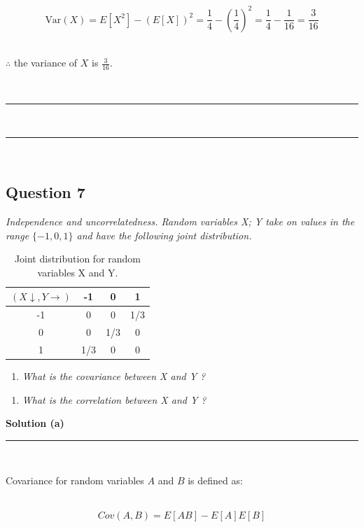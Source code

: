 \documentclass{article}
\begin{document}
$$\text{Var}(X) = E[X^2] - (E[X])^2 = \frac{1}{4} - (\frac{1}{4})^2 = \frac{1}{4} - \frac{1}{16} = \frac{3}{16}$$\\

\parbox{\textwidth}{$\therefore$ the variance of $X$ is $\frac{3}{16}$.}\\

\noindent\rule{\textwidth}{0.4pt}\\
\noindent\rule{\textwidth}{0.4pt}\\

\newpage

\subsection*{Question 7}
\textit{Independence and uncorrelatedness. Random variables X; Y take on values in the range $\{-1,0,1\}$ and have the following joint distribution.}\\

\begin{table}[h]
\centering
\begin{tabular}{c|ccc}
  $(X\downarrow ,Y \rightarrow)$ & -1 & 0 & 1 \\ \hline
-1 & 0 & 0 & 1/3 \\
 0 & 0 & 1/3 & 0 \\
 1 & 1/3 & 0 & 0 \\
\end{tabular}
\caption{Joint distribution for random variables X and Y.}
\label{tab:example_fractions}
\end{table}

\begin{enumerate}[label=(a)]
  \item \textit{What is the covariance between X and Y ?}
\end{enumerate}

\begin{enumerate}[label=(b)]
  \item \textit{What is the correlation between X and Y ?}
\end{enumerate}

\textbf{Solution (a)}

\noindent\rule{\textwidth}{0.4pt}\\

\parbox{\textwidth}{Covariance for random variables $A$ and $B$ is defined as:}\\

$$Cov(A, B) = E[AB] - E[A]E[B]$$
\end{document}
